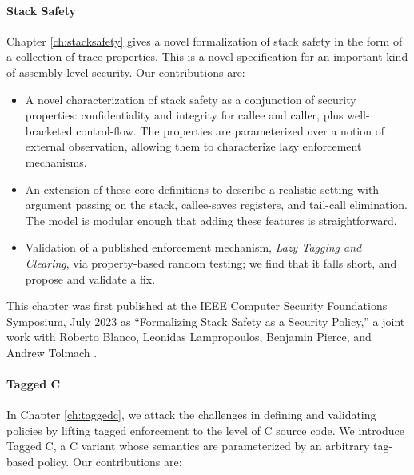 \paragraph{Stack Safety}

Chapter \ref{ch:stacksafety} gives a novel formalization of stack safety in the
form of a collection of trace properties. This is a novel specification for an important
kind of assembly-level security. Our contributions are:

\begin{itemize}
  \item A novel characterization of stack safety as a conjunction
        of security properties: confidentiality and integrity for callee
        and caller, plus well-bracketed control-flow.
        The properties are parameterized over a notion of
        external observation, allowing them to characterize lazy enforcement
        mechanisms.
  \item An extension of these core definitions to
        describe a realistic setting with argument passing on the stack,
        callee-saves registers, and tail-call elimination. The model is
        modular enough that adding these features is straightforward.
  \item Validation of a published enforcement mechanism,
        \emph{Lazy Tagging and Clearing}, via property-based random testing; we find that
        it falls short, and propose and validate a fix.
\end{itemize}

This chapter was first published at the IEEE Computer Security Foundations Symposium,
July 2023 as ``Formalizing Stack Safety as a Security Policy,'' a
joint work with Roberto Blanco, Leonidas Lampropoulos, Benjamin Pierce, and Andrew Tolmach
\cite{Anderson23:StackSafety}.

\paragraph{Tagged C}

In Chapter \ref{ch:taggedc}, we attack the challenges in defining and validating policies
by lifting tagged enforcement to the level of C source code. We introduce Tagged C, a C variant
whose semantics are parameterized by an arbitrary tag-based policy. Our contributions are:

